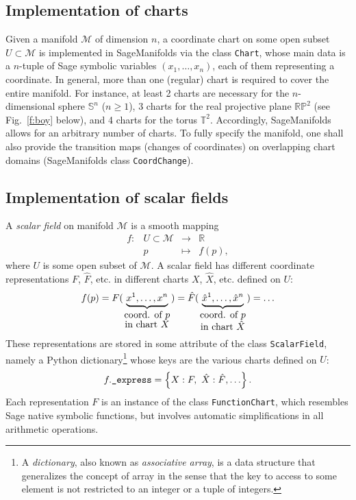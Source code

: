\documentclass[a4paper]{jpconf}
\newcommand{\soft}[1]{\textsf{#1}}
\newcommand{\code}[1]{\texttt{#1}}
\newcommand{\Sage}{\soft{Sage}}
\newcommand{\SM}{\soft{SageManifolds}}
\newcommand{\be}{\begin{equation}}
\newcommand{\ee}{\end{equation}}
\begin{document}
\subsection{Implementation of charts}

Given a manifold $\mathcal{M}$ of dimension $n$, a coordinate chart 
on some open subset $U\subset\mathcal{M}$ is implemented in \SM{} 
via the class \code{Chart}, whose main data is 
a $n$-tuple of \Sage{} symbolic variables $(x_1,\ldots,x_n)$, each of 
them representing a coordinate.
In general, more than one (regular) chart is required to cover the entire manifold.
For instance, at least 2 charts are necessary for the $n$-dimensional sphere 
$\mathbb{S}^n$ ($n\geq 1$), 3 charts for the real projective plane
$\mathbb{RP}^2$ (see Fig.~\ref{f:boy} below), and 4 charts for the torus $\mathbb{T}^2$. 
Accordingly, \SM{} allows for an arbitrary number of charts. 
To fully specify the manifold, one shall also provide the transition maps
(changes of coordinates) on
overlapping chart domains (\SM{} class \code{CoordChange}).


\subsection{Implementation of scalar fields}

A \emph{scalar field} on manifold $\mathcal{M}$ is a smooth mapping
\be
    \begin{array}{lcll}
    f: & U\subset \mathcal{M}&\longrightarrow &\mathbb{R} \\
       & p & \longmapsto  & f(p) ,
    \end{array}
\ee
where $U$ is some open subset of $\mathcal{M}$.
A scalar field has different coordinate representations $F$, $\hat F$, etc. 
in different charts $X$, $\hat X$, etc. defined on $U$:
\be
    f(p) = 
F(\underbrace{x^1,\ldots, x^n}_{\mbox{coord. of $p$}\atop\mbox{in chart $X$}}) 
= {\hat F}(\underbrace{{\hat x}^1,\ldots, {\hat x}^n}_{\mbox{coord. of $p$}\atop\mbox{in chart $\hat X$}})
= \ldots
\ee
These representations are 
stored in some attribute of the class \code{ScalarField}, namely a 
Python dictionary\footnote{A \emph{dictionary}, also known as \emph{associative array}, is a 
data structure that generalizes the concept of array in the sense that the
key to access to some element is not restricted to an integer or a tuple of integers.} 
whose keys are the various charts defined on $U$:
\be \label{e:f_express}
 f.\mbox{\texttt{\_express}} = \left\{ X: F,\ \hat X: \hat F, \ldots \right\} .
\ee
Each representation $F$ is an instance of the class \code{FunctionChart}, 
which resembles \Sage{} native symbolic functions, but involves 
automatic simplifications in all arithmetic operations. 
\end{document}
